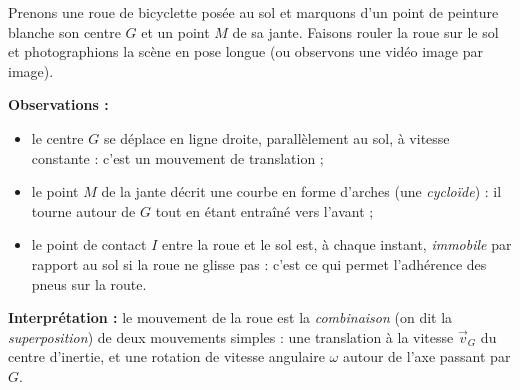\documentclass[11pt]{article}
\newcommand{\cle}[1]{{\popxbold\color{popdark}#1}}
\begin{document}
\begin{experience}
Prenons une roue de bicyclette posée au sol et marquons d'un point de peinture blanche son centre $G$ et un point $M$ de sa jante. Faisons rouler la roue sur le sol et photographions la scène en pose longue (ou observons une vidéo image par image).

\textbf{Observations :}
\begin{itemize}
\item le centre $G$ se déplace en ligne droite, parallèlement au sol, à vitesse constante : c'est un mouvement de \cle{translation} ;
\item le point $M$ de la jante décrit une courbe en forme d'arches (une \emph{cycloïde}) : il tourne autour de $G$ tout en étant entraîné vers l'avant ;
\item le point de contact $I$ entre la roue et le sol est, à chaque instant, \emph{immobile} par rapport au sol si la roue ne glisse pas : c'est ce qui permet l'adhérence des pneus sur la route.
\end{itemize}

\textbf{Interprétation :} le mouvement de la roue est la \emph{combinaison} (on dit la \emph{superposition}) de deux mouvements simples : une translation à la vitesse $\vec{v}_G$ du centre d'inertie, et une rotation de vitesse angulaire $\omega$ autour de l'axe passant par $G$.
\end{experience}
\end{document}
